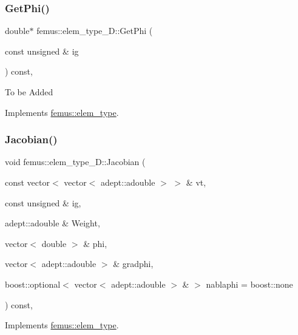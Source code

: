 \subsubsection{\texorpdfstring{Get\+Phi()}{GetPhi()}}
{\footnotesize\ttfamily double$\ast$ femus\+::elem\+\_\+type\+\_\+D\+::\+Get\+Phi (\begin{DoxyParamCaption}\item[{const unsigned \&}]{ig }\end{DoxyParamCaption}) const\hspace{0.3cm}{\ttfamily [inline]}, {\ttfamily [virtual]}}

To be Added 

Implements \mbox{\hyperlink{classfemus_1_1elem__type_a2aa2a37b15debbee27918f5e3f2df6b3}{femus\+::elem\+\_\+type}}.

\mbox{\label{classfemus_1_1elem__type__2_d_af8ad48cebf3ed72aa7d718129bbc381f}} 
\subsubsection{\texorpdfstring{Jacobian()}{Jacobian()}\hspace{0.1cm}{\footnotesize\ttfamily [1/4]}}
{\footnotesize\ttfamily void femus\+::elem\+\_\+type\+\_\+D\+::\+Jacobian (\begin{DoxyParamCaption}\item[{const vector$<$ vector$<$ adept\+::adouble $>$ $>$ \&}]{vt,  }\item[{const unsigned \&}]{ig,  }\item[{adept\+::adouble \&}]{Weight,  }\item[{vector$<$ double $>$ \&}]{phi,  }\item[{vector$<$ adept\+::adouble $>$ \&}]{gradphi,  }\item[{boost\+::optional$<$ vector$<$ adept\+::adouble $>$ \& $>$}]{nablaphi = {\ttfamily boost\+:\+:none} }\end{DoxyParamCaption}) const\hspace{0.3cm}{\ttfamily [inline]}, {\ttfamily [virtual]}}



Implements \mbox{\hyperlink{classfemus_1_1elem__type_a937b1d5ecbeed3b17db831264a3492fa}{femus\+::elem\+\_\+type}}.

